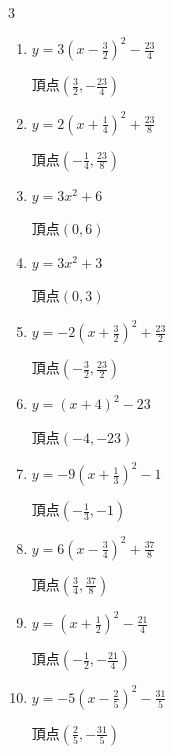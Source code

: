 \begin{multicols}{3}
\begin{enumerate}
        $\displaystyle 頂点\left( \frac{9}{14} , \frac{171}{28} \right)$

  \item $\displaystyle y=3\left( x-\frac{3}{2}\right)^{2}-\frac{23}{4}$

        $\displaystyle 頂点\left( \frac{3}{2} , -\frac{23}{4} \right)$

  \item $\displaystyle y=2\left( x+\frac{1}{4}\right)^{2}+\frac{23}{8}$

        $\displaystyle 頂点\left( -\frac{1}{4} , \frac{23}{8} \right)$

  \item $\displaystyle y=3x^{2}+6$

        $\displaystyle 頂点\left( 0 , 6 \right)$

  \item $\displaystyle y=3x^{2}+3$

        $\displaystyle 頂点\left( 0 , 3 \right)$

  \item $\displaystyle y=-2\left( x+\frac{3}{2}\right)^{2}+\frac{23}{2}$

        $\displaystyle 頂点\left( -\frac{3}{2} , \frac{23}{2} \right)$

  \item $\displaystyle y=\left( x+4\right)^{2}-23$

        $\displaystyle 頂点\left( -4 , -23 \right)$

  \item $\displaystyle y=-9\left( x+\frac{1}{3}\right)^{2}-1$

        $\displaystyle 頂点\left( -\frac{1}{3} , -1 \right)$

  \item $\displaystyle y=6\left( x-\frac{3}{4}\right)^{2}+\frac{37}{8}$

        $\displaystyle 頂点\left( \frac{3}{4} , \frac{37}{8} \right)$

\columnbreak %

\resetques

  \item $\displaystyle y=\left( x+\frac{1}{2}\right)^{2}-\frac{21}{4}$

        $\displaystyle 頂点\left( -\frac{1}{2} , -\frac{21}{4} \right)$

  \item $\displaystyle y=-5\left( x-\frac{2}{5}\right)^{2}-\frac{31}{5}$

        $\displaystyle 頂点\left( \frac{2}{5} , -\frac{31}{5} \right)$


\end{enumerate}
\end{multicols}
